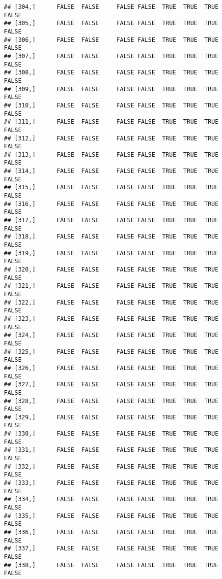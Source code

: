 \documentclass[
]{article}
\begin{document}
\begin{verbatim}
## [304,]      FALSE  FALSE     FALSE FALSE  TRUE  TRUE  TRUE         FALSE
## [305,]      FALSE  FALSE     FALSE FALSE  TRUE  TRUE  TRUE         FALSE
## [306,]      FALSE  FALSE     FALSE FALSE  TRUE  TRUE  TRUE         FALSE
## [307,]      FALSE  FALSE     FALSE FALSE  TRUE  TRUE  TRUE         FALSE
## [308,]      FALSE  FALSE     FALSE FALSE  TRUE  TRUE  TRUE         FALSE
## [309,]      FALSE  FALSE     FALSE FALSE  TRUE  TRUE  TRUE         FALSE
## [310,]      FALSE  FALSE     FALSE FALSE  TRUE  TRUE  TRUE         FALSE
## [311,]      FALSE  FALSE     FALSE FALSE  TRUE  TRUE  TRUE         FALSE
## [312,]      FALSE  FALSE     FALSE FALSE  TRUE  TRUE  TRUE         FALSE
## [313,]      FALSE  FALSE     FALSE FALSE  TRUE  TRUE  TRUE         FALSE
## [314,]      FALSE  FALSE     FALSE FALSE  TRUE  TRUE  TRUE         FALSE
## [315,]      FALSE  FALSE     FALSE FALSE  TRUE  TRUE  TRUE         FALSE
## [316,]      FALSE  FALSE     FALSE FALSE  TRUE  TRUE  TRUE         FALSE
## [317,]      FALSE  FALSE     FALSE FALSE  TRUE  TRUE  TRUE         FALSE
## [318,]      FALSE  FALSE     FALSE FALSE  TRUE  TRUE  TRUE         FALSE
## [319,]      FALSE  FALSE     FALSE FALSE  TRUE  TRUE  TRUE         FALSE
## [320,]      FALSE  FALSE     FALSE FALSE  TRUE  TRUE  TRUE         FALSE
## [321,]      FALSE  FALSE     FALSE FALSE  TRUE  TRUE  TRUE         FALSE
## [322,]      FALSE  FALSE     FALSE FALSE  TRUE  TRUE  TRUE         FALSE
## [323,]      FALSE  FALSE     FALSE FALSE  TRUE  TRUE  TRUE         FALSE
## [324,]      FALSE  FALSE     FALSE FALSE  TRUE  TRUE  TRUE         FALSE
## [325,]      FALSE  FALSE     FALSE FALSE  TRUE  TRUE  TRUE         FALSE
## [326,]      FALSE  FALSE     FALSE FALSE  TRUE  TRUE  TRUE         FALSE
## [327,]      FALSE  FALSE     FALSE FALSE  TRUE  TRUE  TRUE         FALSE
## [328,]      FALSE  FALSE     FALSE FALSE  TRUE  TRUE  TRUE         FALSE
## [329,]      FALSE  FALSE     FALSE FALSE  TRUE  TRUE  TRUE         FALSE
## [330,]      FALSE  FALSE     FALSE FALSE  TRUE  TRUE  TRUE         FALSE
## [331,]      FALSE  FALSE     FALSE FALSE  TRUE  TRUE  TRUE         FALSE
## [332,]      FALSE  FALSE     FALSE FALSE  TRUE  TRUE  TRUE         FALSE
## [333,]      FALSE  FALSE     FALSE FALSE  TRUE  TRUE  TRUE         FALSE
## [334,]      FALSE  FALSE     FALSE FALSE  TRUE  TRUE  TRUE         FALSE
## [335,]      FALSE  FALSE     FALSE FALSE  TRUE  TRUE  TRUE         FALSE
## [336,]      FALSE  FALSE     FALSE FALSE  TRUE  TRUE  TRUE         FALSE
## [337,]      FALSE  FALSE     FALSE FALSE  TRUE  TRUE  TRUE         FALSE
## [338,]      FALSE  FALSE     FALSE FALSE  TRUE  TRUE  TRUE         FALSE

\end{verbatim}
\end{document}
